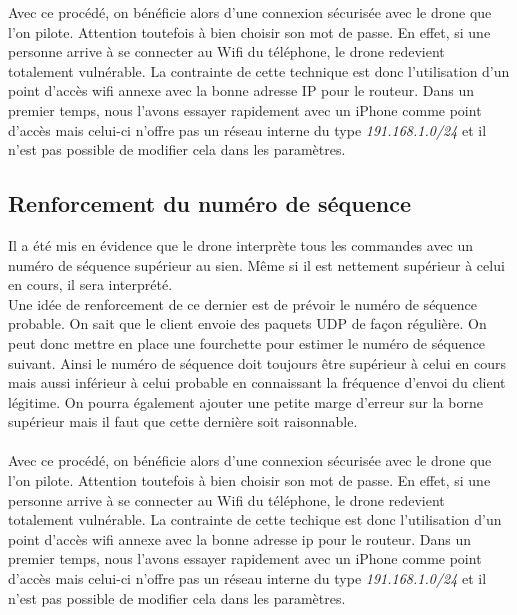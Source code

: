 Avec ce procédé, on bénéficie alors d'une connexion sécurisée avec le drone que l'on pilote. Attention toutefois à bien choisir son mot de passe. En effet, si une personne arrive à se connecter au Wifi du téléphone, le drone redevient totalement vulnérable. La contrainte de cette technique est donc l'utilisation d'un point d'accès wifi annexe avec la bonne adresse IP pour le routeur. Dans un premier temps, nous l'avons essayer rapidement avec un iPhone comme point d'accès mais celui-ci n'offre pas un réseau interne du type \textit{191.168.1.0/24} et il n'est pas possible de modifier cela dans les paramètres.

\subsection{Renforcement du numéro de séquence}
Il a été mis en évidence que le drone interprète tous les commandes avec un numéro de séquence supérieur au sien. Même si il est nettement supérieur à celui en cours, il sera interprété.\\
Une idée de renforcement de ce dernier est de prévoir le numéro de séquence probable. On sait que le client envoie des paquets UDP de façon régulière. On peut donc mettre en place une fourchette pour estimer le numéro de séquence suivant. Ainsi le numéro de séquence doit toujours être supérieur à celui en cours mais aussi inférieur à celui probable en connaissant la fréquence d’envoi du client légitime. On pourra également ajouter une petite marge d'erreur sur la borne supérieur mais il faut que cette dernière soit raisonnable.\\\\
Avec ce procédé, on bénéficie alors d'une connexion sécurisée avec le drone que l'on pilote. Attention toutefois à bien choisir son mot de passe. En effet, si une personne arrive à se connecter au Wifi du téléphone, le drone redevient totalement vulnérable. La contrainte de cette techique est donc l'utilisation d'un point d'accès wifi annexe avec la bonne adresse ip pour le routeur. Dans un premier temps, nous l'avons essayer rapidement avec un iPhone comme point d'accès mais celui-ci n'offre pas un réseau interne du type \textit{191.168.1.0/24} et il n'est pas possible de modifier cela dans les paramètres.

